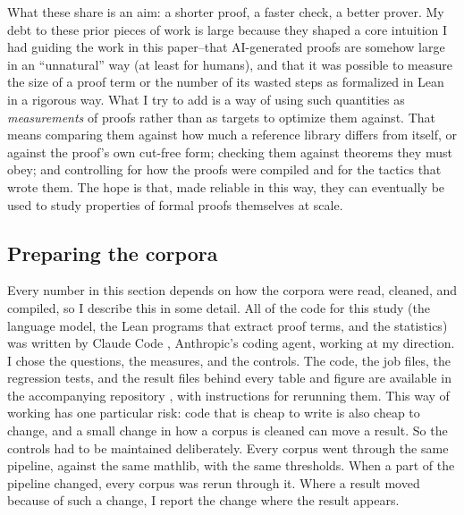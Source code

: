\documentclass{article}
\begin{document}
What these share is an aim: a shorter proof, a faster check, a better prover. My debt to these prior pieces of work is large because
they shaped a core intuition I had guiding the work in this paper--that AI-generated proofs are somehow large in an ``unnatural''
way (at least for humans), and that it was possible to measure the size of a proof term or the number of its wasted steps as formalized 
in Lean in a rigorous way. What I try to add is a way of using such
quantities as \textit{measurements} of proofs rather than as targets to optimize them against. That means comparing them against how much a reference
library differs from itself, or against the proof's own cut-free form; checking them against theorems they must obey;
and controlling for how the proofs were compiled and for the tactics that wrote them. The hope is that, made reliable
in this way, they can eventually be used to study properties of formal proofs themselves at scale.

\subsection{Preparing the corpora}
Every number in this section depends on how the corpora were read, cleaned, and compiled, so I describe this in some
detail. All of the code for this study (the language model, the Lean programs that extract proof terms, and the
statistics) was written by Claude Code \textit{\parencite{claudecode}}, Anthropic's coding agent, working at my direction. I chose the questions, the
measures, and the controls. The code, the job files, the regression tests, and the result files behind every table
and figure are available in the accompanying repository \textit{\parencite{aryal2026code}}, with instructions for
rerunning them. This way of working has one particular risk: code that is cheap to write is also cheap to
change, and a small change in how a corpus is cleaned can move a result. So the controls had to be maintained
deliberately. Every corpus went through the same pipeline, against the same mathlib, with the same thresholds. When a
part of the pipeline changed, every corpus was rerun through it. Where a
result moved because of such a change, I report the change where the result appears.
\end{document}
